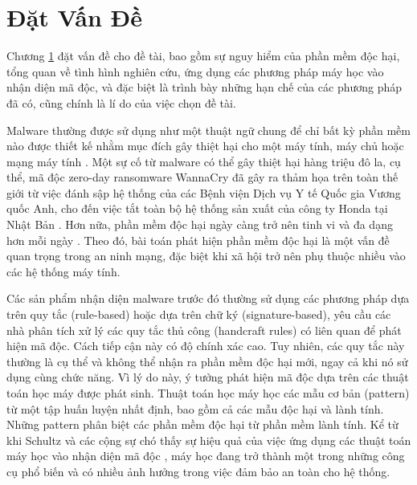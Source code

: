 
\chapter{Đặt Vấn Đề}
\label{chap:problem-statement}
\graphicspath{{Chapter1/Figs/}}

\begin{chapabstract}
{Chương \ref{chap:problem-statement} đặt vấn đề cho đề tài, bao gồm sự nguy hiểm của phần mềm độc hại, tổng quan về tình hình nghiên cứu, ứng dụng các phương pháp máy học vào nhận diện mã độc, và đặc biệt là trình bày những hạn chế của các phương pháp đã có, cũng chính là lí do của việc chọn đề tài.}
\end{chapabstract}
Malware thường được sử dụng như một thuật ngữ chung để chỉ bất kỳ phần mềm nào được thiết kế nhằm mục đích gây thiệt hại cho một máy tính, máy chủ hoặc mạng máy tính \cite{moir2003defining}. 
Một sự cố từ malware có thể gây thiệt hại hàng triệu đô la, cụ thể, mã độc zero-day ransomware WannaCry đã gây ra thảm họa trên toàn thế giới từ việc đánh sập hệ thống của các Bệnh viện Dịch vụ Y tế Quốc gia Vương quốc Anh, cho đến việc tắt toàn bộ hệ thống sản xuất của công ty Honda tại Nhật Bản \cite{chen2017automated}.
Hơn nữa, phần mềm độc hại ngày càng trở nên tinh vi và đa dạng hơn mỗi ngày \cite{shahi2009technology}. Theo đó, bài toán phát hiện phần mềm độc hại là một vấn đề quan trọng trong an ninh mạng, đặc biệt khi xã hội trở nên phụ thuộc nhiều vào các hệ thống máy tính.

Các sản phẩm nhận diện malware trước đó thường sử dụng các phương pháp dựa trên quy tắc (rule-based) hoặc dựa trên chữ ký (signature-based), yêu cầu các nhà phân tích xử lý các quy tắc thủ công (handcraft rules) có liên quan để phát hiện mã độc.
Cách tiếp cận này có độ chính xác cao.
Tuy nhiên, các quy tắc này  thường là cụ thể và không thể nhận ra phần mềm độc hại mới, ngay cả khi nó sử dụng cùng chức năng.
Vì lý do này, ý tưởng phát hiện mã độc dựa trên các thuật toán học máy được phát sinh.
Thuật toán học máy học các mẫu cơ bản (pattern) từ một tập huấn luyện nhất định, bao gồm cả các mẫu độc hại và lành tính.
Những pattern phân biệt các phần mềm độc hại từ phần mềm lành tính.
Kể từ khi Schultz và các cộng sự chó thấy sự hiệu quả của việc ứng dụng các thuật toán máy học vào nhận diện mã độc \cite{schultz2001data}, máy học đang trở thành một trong những công cụ phổ biến và có nhiều ảnh hưởng trong việc đảm bảo an toàn cho hệ thống.

